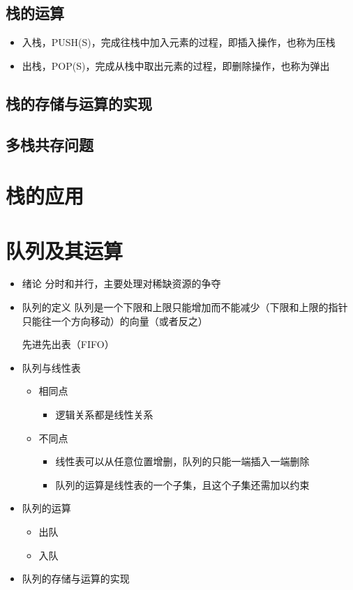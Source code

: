 \documentclass[AutoFakeBold]{LZUThesis2007}
\begin{document}
		\subsection{栈的运算}
			\begin{itemize}
				\item 入栈，PUSH(S)，完成往栈中加入元素的过程，即插入操作，也称为压栈
				\item 出栈，POP(S)，完成从栈中取出元素的过程，即删除操作，也称为弹出
			\end{itemize}

		\subsection{栈的存储与运算的实现}
		\subsection{多栈共存问题}

	\section{栈的应用}

	\section{队列及其运算}
		\begin{itemize}
			\item 绪论
			分时和并行，主要处理对稀缺资源的争夺
			\item 队列的定义
			队列是一个下限和上限只能增加而不能减少（下限和上限的指针只能往一个方向移动）的向量（或者反之）

			先进先出表（FIFO）
			\item 队列与线性表
			\begin{itemize}
				\item 相同点
					\begin{itemize}
						\item 逻辑关系都是线性关系
					\end{itemize}

				\item 不同点
					\begin{itemize}
						\item 线性表可以从任意位置增删，队列的只能一端插入一端删除
						\item 队列的运算是线性表的一个子集，且这个子集还需加以约束
					\end{itemize}

			\end{itemize}
			\item 队列的运算
				\begin{itemize}
					\item 出队
					\item 入队
				\end{itemize}

			\item 队列的存储与运算的实现
		\end{itemize}
\end{document}
